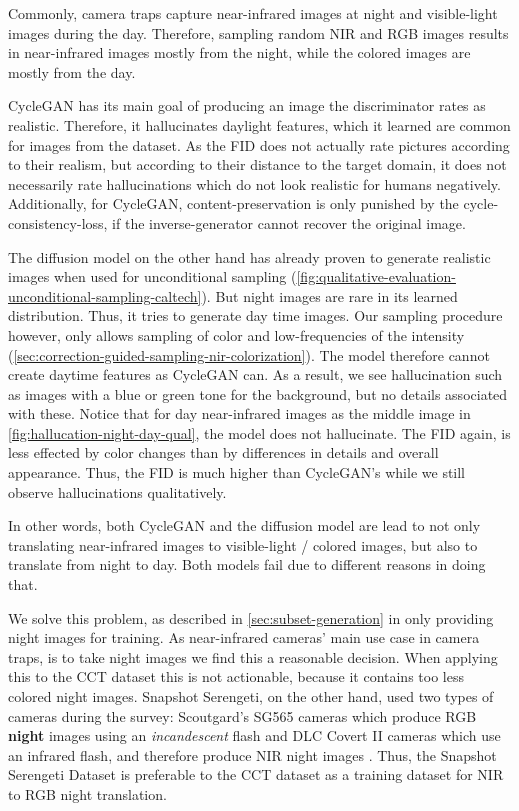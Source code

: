 Commonly, camera traps capture near-infrared images at night and visible-light images during the day.
Therefore, sampling random NIR and RGB images results in near-infrared images mostly from the night, while the colored images are mostly from the day.

CycleGAN has its main goal of producing an image the discriminator rates as realistic.
Therefore, it hallucinates daylight features, which it learned are common for images from the dataset.
As the FID does not actually rate pictures according to their realism, but according to their distance to the target domain,
it does not necessarily rate hallucinations which do not look realistic for humans negatively.
Additionally, for CycleGAN, content-preservation is only punished by the cycle-consistency-loss, if the inverse-generator cannot recover the original image.

The diffusion model on the other hand has already proven to generate realistic images when used for unconditional sampling (\autoref{fig:qualitative-evaluation-unconditional-sampling-caltech}).
But night images are rare in its learned distribution.
Thus, it tries to generate day time images.
Our sampling procedure however, only allows sampling of color and low-frequencies of the intensity (\autoref{sec:correction-guided-sampling-nir-colorization}).
The model therefore cannot create daytime features as CycleGAN can.
As a result, we see hallucination such as images with a blue or green tone for the background,
but no details associated with these.
Notice that for day near-infrared images as the middle image in \autoref{fig:hallucation-night-day-qual}, the model does not hallucinate.
The FID again, is less effected by color changes than by differences in details and overall appearance.
Thus, the FID is much higher than CycleGAN's while we still observe hallucinations qualitatively.

In other words, both CycleGAN and the diffusion model are lead to not only translating near-infrared images to visible-light / colored images,
but also to translate from night to day. Both models fail due to different reasons in doing that.

We solve this problem, as described in \autoref{sec:subset-generation} in only providing night images for training.
As near-infrared cameras' main use case in camera traps, is to take night images we find this a reasonable decision.
When applying this to the CCT dataset \parencite{caltech} this is not actionable, because it contains too less colored night images.
Snapshot Serengeti, on the other hand, used two types of cameras during the survey:
Scoutgard's SG565 cameras which produce RGB \textbf{night} images using an \textit{incandescent} flash and
DLC Covert II cameras which use an infrared flash, and therefore produce NIR night images \parencite{serengeti}.
Thus, the Snapshot Serengeti Dataset is preferable to the CCT dataset as a training dataset for NIR to RGB night translation.

